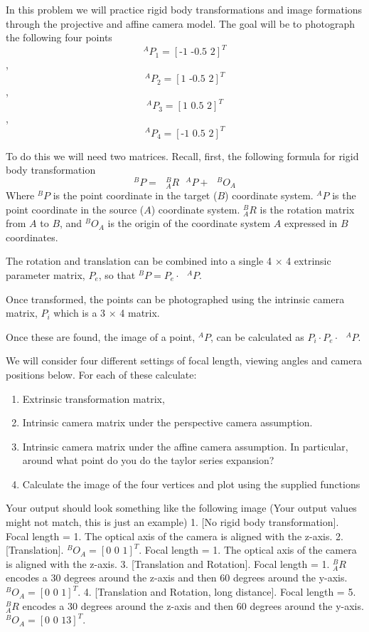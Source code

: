\documentclass[11pt]{article}
\begin{document}
In this problem we will practice rigid body transformations and image
formations through the projective and affine camera model. The goal will
be to photograph the following four points
\[^AP_1 = [\text{-1 -0.5 2}]^T\], \[^AP_2 = [\text{1 -0.5 2}]^T\],
\[^AP_3 = [\text{1 0.5 2}]^T\], \[^AP_4 = [\text{-1 0.5 2}]^T\]

To do this we will need two matrices. Recall, first, the following
formula for rigid body transformation \[
^BP = \text{ } ^B_AR\text{ }^AP + \text{ } ^BO_A
\] Where \(^BP\) is the point coordinate in the target (\(B\))
coordinate system. \(^AP\) is the point coordinate in the source (\(A\))
coordinate system. \(^B_AR\) is the rotation matrix from \(A\) to \(B\),
and \(^BO_A\) is the origin of the coordinate system \(A\) expressed in
\(B\) coordinates.

The rotation and translation can be combined into a single 4 \(\times\)
4 extrinsic parameter matrix, \(P_e\), so that
\(^BP = P_e \cdot \text{ }^AP\).

Once transformed, the points can be photographed using the intrinsic
camera matrix, \(P_i\) which is a 3 \(\times\) 4 matrix.

Once these are found, the image of a point, \(^AP\), can be calculated
as \(P_i \cdot P_e \cdot \text{ }^AP\).

We will consider four different settings of focal length, viewing angles
and camera positions below. For each of these calculate:

\begin{enumerate}
\def\labelenumi{\alph{enumi})}
\item
  Extrinsic transformation matrix,
\item
  Intrinsic camera matrix under the perspective camera assumption.
\item
  Intrinsic camera matrix under the affine camera assumption. In
  particular, around what point do you do the taylor series expansion?
\item
  Calculate the image of the four vertices and plot using the supplied
  functions
\end{enumerate}

Your output should look something like the following image (Your output
values might not match, this is just an example) 1. {[}No rigid body
transformation{]}. Focal length = 1. The optical axis of the camera is
aligned with the z-axis. 2. {[}Translation{]}.
\(^BO_A = [\text{0 0 1}]^T\). Focal length = 1. The optical axis of the
camera is aligned with the z-axis. 3. {[}Translation and Rotation{]}.
Focal length = 1. \(^B_AR\) encodes a 30 degrees around the z-axis and
then 60 degrees around the y-axis. \(^BO_A = [\text{0 0 1}]^T\). 4.
{[}Translation and Rotation, long distance{]}. Focal length = 5.
\(^B_AR\) encodes a 30 degrees around the z-axis and then 60 degrees
around the y-axis. \(^BO_A = [\text{0 0 13}]^T\).
\end{document}
